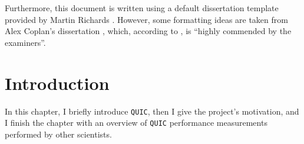 \documentclass[12pt,a4paper,twoside,openright]{report}
\begin{document}
Furthermore, this document is written using a default dissertation template provided by Martin Richards \cite{how_to_write_a_dissertation_in_LATEX}.
However, some formatting ideas are taken from Alex Coplan's dissertation \cite{Alex_Coplan_dissertation}, which, according to \cite{Computer_Lab_dissertations}, is \enquote{highly commended by the examiners}.


\pagestyle{headings}

\chapter{Introduction}
In this chapter, I briefly introduce \texttt{QUIC}, then I give the project's motivation, and I finish the chapter with an overview of \texttt{QUIC} performance measurements performed by other scientists.

%







\end{document}
